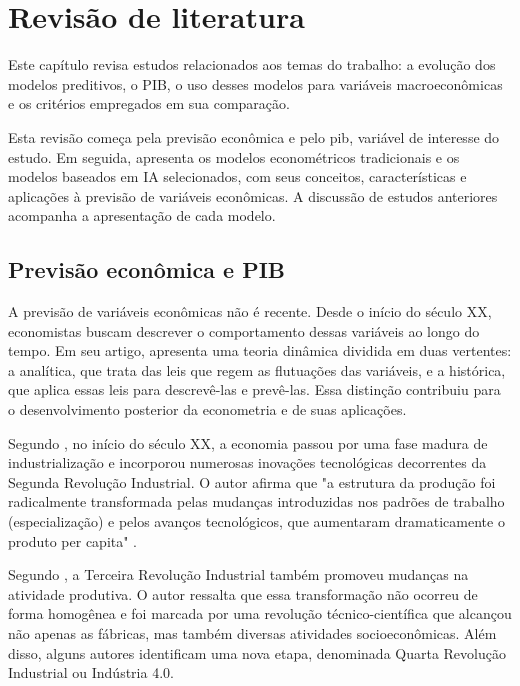 \chapter{Revisão de literatura}
\label{cap:revisao-literatura}

Este capítulo revisa estudos relacionados aos temas do trabalho: a evolução dos modelos preditivos, o PIB, o uso desses modelos para variáveis macroeconômicas e os critérios empregados em sua comparação.

Esta revisão começa pela previsão econômica e pelo \ac{pib}, variável de interesse do estudo. Em seguida, apresenta os modelos econométricos tradicionais e os modelos baseados em IA selecionados, com seus conceitos, características e aplicações à previsão de variáveis econômicas. A discussão de estudos anteriores acompanha a apresentação de cada modelo.

\section{Previsão econômica e PIB}


A previsão de variáveis econômicas não é recente. Desde o início do século XX, economistas buscam descrever o comportamento dessas variáveis ao longo do tempo. Em seu artigo,  apresenta uma teoria dinâmica dividida em duas vertentes: a analítica, que trata das leis que regem as flutuações das variáveis, e a histórica, que aplica essas leis para descrevê-las e prevê-las. Essa distinção contribuiu para o desenvolvimento posterior da econometria e de suas aplicações.

Segundo , no início do século XX, a economia passou por uma fase madura de industrialização e incorporou numerosas inovações tecnológicas decorrentes da Segunda Revolução Industrial. O autor afirma que "a estrutura da produção foi radicalmente transformada pelas mudanças introduzidas nos padrões de trabalho (especialização) e pelos avanços tecnológicos, que aumentaram dramaticamente o produto per capita" .

Segundo , a Terceira Revolução Industrial também promoveu mudanças na atividade produtiva. O autor ressalta que essa transformação não ocorreu de forma homogênea e foi marcada por uma revolução técnico-científica que alcançou não apenas as fábricas, mas também diversas atividades socioeconômicas. Além disso, alguns autores identificam uma nova etapa, denominada Quarta Revolução Industrial ou Indústria 4.0.

